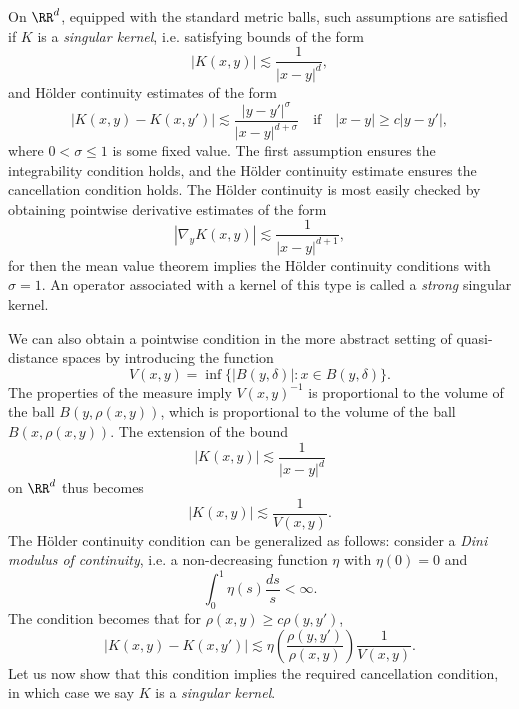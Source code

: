 On $\RR^d$, equipped with the standard metric balls, such assumptions are satisfied if $K$ is a \emph{singular kernel}, i.e. satisfying bounds of the form
%
\[ |K(x,y)| \lesssim \frac{1}{|x - y|^{d}}, \]
%
and H\"{o}lder continuity estimates of the form
%
\[ |K(x,y) - K(x,y')| \lesssim \frac{|y - y'|^\sigma}{|x - y|^{d + \sigma}} \quad\text{if}\quad |x - y| \geq c |y - y'|, \]
%
%
%
where $0 < \sigma \leq 1$ is some fixed value. The first assumption ensures the integrability condition holds, and the H\"{o}lder continuity estimate ensures the cancellation condition holds. The H\"{o}lder continuity is most easily checked by obtaining pointwise derivative estimates of the form
%
\[ |\nabla_y K(x,y)| \lesssim \frac{1}{|x - y|^{d+1}}, \]
%
for then the mean value theorem implies the H\"{o}lder continuity conditions with $\sigma = 1$. An operator associated with a kernel of this type is called a \emph{strong} singular kernel.

We can also obtain a pointwise condition in the more abstract setting of quasi-distance spaces by introducing the function
%
\[ V(x,y) = \inf \{ |B(y,\delta)| : x \in B(y,\delta) \}. \]
%
The properties of the measure imply $V(x,y)^{-1}$ is proportional to the volume of the ball $B(y,\rho(x,y))$, which is proportional to the volume of the ball $B(x,\rho(x,y))$. The extension of the bound
%
\[ |K(x,y)| \lesssim \frac{1}{|x - y|^d} \]
%
on $\RR^d$ thus becomes
%
\[ |K(x,y)| \lesssim \frac{1}{V(x,y)}. \]
%
The H\"{o}lder continuity condition can be generalized as follows: consider a \emph{Dini modulus of continuity}, i.e. a non-decreasing function $\eta$ with $\eta(0) = 0$ and
%
\[ \int_0^1 \eta(s) \frac{ds}{s} < \infty. \]
%
The condition becomes that for $\rho(x,y) \geq c \rho(y,y')$,
%
\[ |K(x,y) - K(x,y')| \lesssim \eta \left( \frac{\rho(y,y')}{\rho(x,y)} \right) \frac{1}{V(x,y)}. \]
%
Let us now show that this condition implies the required cancellation condition, in which case we say $K$ is a \emph{singular kernel}.

